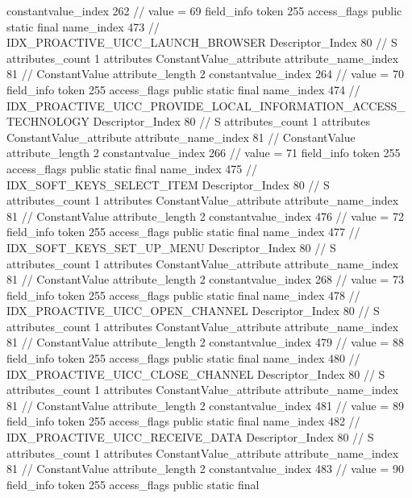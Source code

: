 {{{{{{{					constantvalue_index	262		// value = 69
				}
				}
			}
			field_info {
				token	255
				access_flags	public static final
				name_index	473		// IDX_PROACTIVE_UICC_LAUNCH_BROWSER
				Descriptor_Index	80		// S
				attributes_count	1
				attributes {
				ConstantValue_attribute {
					attribute_name_index	81		// ConstantValue
					attribute_length	2
					constantvalue_index	264		// value = 70
				}
				}
			}
			field_info {
				token	255
				access_flags	public static final
				name_index	474		// IDX_PROACTIVE_UICC_PROVIDE_LOCAL_INFORMATION_ACCESS_TECHNOLOGY
				Descriptor_Index	80		// S
				attributes_count	1
				attributes {
				ConstantValue_attribute {
					attribute_name_index	81		// ConstantValue
					attribute_length	2
					constantvalue_index	266		// value = 71
				}
				}
			}
			field_info {
				token	255
				access_flags	public static final
				name_index	475		// IDX_SOFT_KEYS_SELECT_ITEM
				Descriptor_Index	80		// S
				attributes_count	1
				attributes {
				ConstantValue_attribute {
					attribute_name_index	81		// ConstantValue
					attribute_length	2
					constantvalue_index	476		// value = 72
				}
				}
			}
			field_info {
				token	255
				access_flags	public static final
				name_index	477		// IDX_SOFT_KEYS_SET_UP_MENU
				Descriptor_Index	80		// S
				attributes_count	1
				attributes {
				ConstantValue_attribute {
					attribute_name_index	81		// ConstantValue
					attribute_length	2
					constantvalue_index	268		// value = 73
				}
				}
			}
			field_info {
				token	255
				access_flags	public static final
				name_index	478		// IDX_PROACTIVE_UICC_OPEN_CHANNEL
				Descriptor_Index	80		// S
				attributes_count	1
				attributes {
				ConstantValue_attribute {
					attribute_name_index	81		// ConstantValue
					attribute_length	2
					constantvalue_index	479		// value = 88
				}
				}
			}
			field_info {
				token	255
				access_flags	public static final
				name_index	480		// IDX_PROACTIVE_UICC_CLOSE_CHANNEL
				Descriptor_Index	80		// S
				attributes_count	1
				attributes {
				ConstantValue_attribute {
					attribute_name_index	81		// ConstantValue
					attribute_length	2
					constantvalue_index	481		// value = 89
				}
				}
			}
			field_info {
				token	255
				access_flags	public static final
				name_index	482		// IDX_PROACTIVE_UICC_RECEIVE_DATA
				Descriptor_Index	80		// S
				attributes_count	1
				attributes {
				ConstantValue_attribute {
					attribute_name_index	81		// ConstantValue
					attribute_length	2
					constantvalue_index	483		// value = 90
				}
				}
			}
			field_info {
				token	255
				access_flags	public static final
}}}}}
